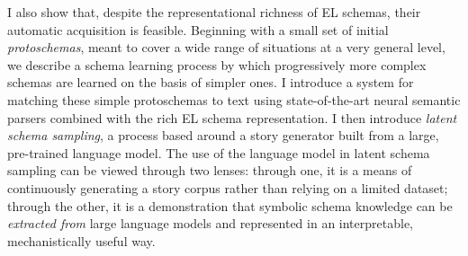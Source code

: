 I also show that, despite the representational richness of EL schemas, their automatic acquisition is feasible. Beginning with a small set of initial \textit{protoschemas}, meant to cover a wide range of situations at a very general level, we describe a schema learning process by which progressively more complex schemas are learned on the basis of simpler ones. I introduce a system for matching these simple protoschemas to text using state-of-the-art neural semantic parsers combined with the rich EL schema representation. I then introduce \textit{latent schema sampling}, a process based around a story generator built from a large, pre-trained language model. The use of the language model in latent schema sampling can be viewed through two lenses: through one, it is a means of continuously generating a story corpus rather than relying on a limited dataset; through the other, it is a demonstration that symbolic schema knowledge can be \textit{extracted from} large language models and represented in an interpretable, mechanistically useful way.

